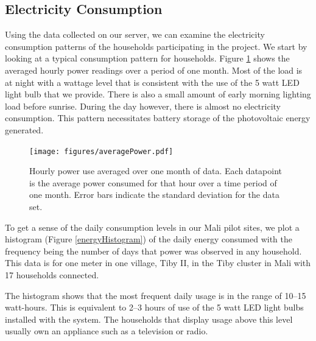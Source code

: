 \documentclass{sig-alternate}
\newcommand{\note}[1]{{\color{red} NOTE: *** #1 ***}}
\begin{document}


\subsection{Electricity Consumption}
Using the data collected on our server, we can examine the electricity
consumption patterns of the households participating in the project.
We start by looking at a typical consumption pattern for households.
Figure \ref{averagedAccumulatedEnergy} shows the averaged
hourly power readings over a period of one month.
Most of the load is at night with a wattage level that is consistent
with the use of the 5 watt LED light bulb that we provide.
There is also a small amount of early morning lighting load before sunrise.
During the day however, there is almost no electricity consumption.
This pattern necessitates battery storage of the photovoltaic energy
generated.

\begin{figure}[]
\begin{center}
\texttt{[image: figures/averagePower.pdf]}
\end{center}
\caption{Hourly power use averaged over one month of data.  Each datapoint is the
average power consumed for that hour over a time period of one month.  Error bars
indicate the standard deviation for the data set.}
\label{averagedAccumulatedEnergy}
\end{figure}

To get a sense of the daily consumption levels in our Mali pilot sites,
we plot a histogram (Figure \ref{energyHistogram}) of the daily
energy consumed with the frequency being
the number of days that power was observed in any household.
This data is for one meter in one village, Tiby II, in the Tiby cluster
in Mali with 17 households connected.

The histogram shows that the most frequent
daily usage is in the range of 10--15 watt-hours.
This is equivalent to 2--3 hours of use of the 5 watt LED
light bulbs installed with the system.
The households that display usage above this level usually own an appliance
such as a television or radio.
\end{document}
